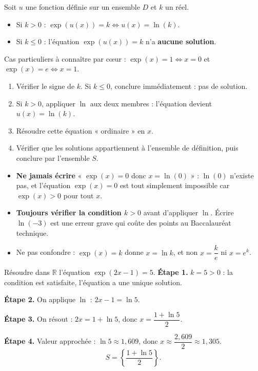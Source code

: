 \documentclass[11pt]{article}
\begin{document}
\begin{propriete}
Soit $u$ une fonction définie sur un ensemble $D$ et $k$ un réel.
\begin{itemize}
\item Si $k > 0$ : $\exp(u(x)) = k \iff u(x) = \ln(k)$.
\item Si $k \leq 0$ : l'équation $\exp(u(x)) = k$ n'a \textbf{aucune solution}.
\end{itemize}
Cas particuliers à connaître par cœur : $\exp(x) = 1 \iff x = 0$ et $\exp(x) = e \iff x = 1$.
\end{propriete}

\begin{methode}[Résoudre $\exp(u(x)) = k$]
\begin{enumerate}
\item Vérifier le signe de $k$. Si $k \leq 0$, conclure immédiatement : pas de solution.
\item Si $k > 0$, appliquer $\ln$ aux deux membres : l'équation devient $u(x) = \ln(k)$.
\item Résoudre cette équation « ordinaire » en $x$.
\item Vérifier que les solutions appartiennent à l'ensemble de définition, puis conclure par l'ensemble $S$.
\end{enumerate}
\end{methode}

\begin{attention}
\begin{itemize}
\item \textbf{Ne jamais écrire} « $\exp(x) = 0$ donc $x = \ln(0)$ » : $\ln(0)$ n'existe pas, et l'équation $\exp(x) = 0$ est tout simplement impossible car $\exp(x) > 0$ pour tout $x$.
\item \textbf{Toujours vérifier la condition $k > 0$} avant d'appliquer $\ln$. Écrire $\ln(-3)$ est une erreur grave qui coûte des points au Baccalauréat technique.
\item Ne pas confondre : $\exp(x) = k$ donne $x = \ln k$, et non $x = \dfrac{k}{e}$ ni $x = e^{k}$.
\end{itemize}
\end{attention}

\begin{exoresolu}[Résoudre $\exp(2x-1) = 5$]
Résoudre dans $\mathbb{R}$ l'équation $\exp(2x-1) = 5$.
\tcblower
\textbf{Étape 1.} $k = 5 > 0$ : la condition est satisfaite, l'équation a une unique solution.

\textbf{Étape 2.} On applique $\ln$ : $2x - 1 = \ln 5$.

\textbf{Étape 3.} On résout : $2x = 1 + \ln 5$, donc $x = \dfrac{1 + \ln 5}{2}$.

\textbf{Étape 4.} Valeur approchée : $\ln 5 \approx 1,609$, donc $x \approx \dfrac{2,609}{2} \approx 1,305$.
\[
S = \left\{ \frac{1 + \ln 5}{2} \right\}.
\]
\end{exoresolu}
\end{document}
